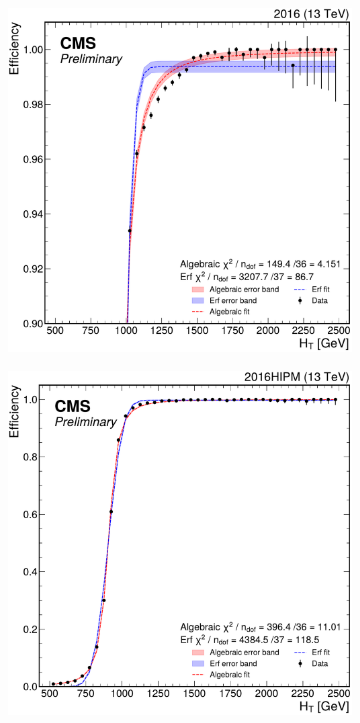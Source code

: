 \begin{figure}
\begin{subfigure}{.36\linewidth}
		\includegraphics[width=\linewidth]{Images/pdfs/fits_closeup_16.pdf}
	\end{subfigure}
	\begin{subfigure}{.36\linewidth}
		\includegraphics[width=\linewidth]{Images/pdfs/fits_16-APV-HIPM.pdf}

\end{subfigure}
\end{figure}
